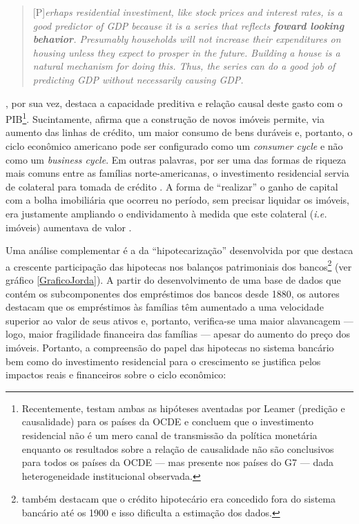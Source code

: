 \begin{quote}
	
	[P]\textit{erhaps residential investiment, like stock prices and interest rates, is a good predictor of GDP because it is a series that reflects \textbf{foward looking behavior}. Presumably households will not increase their expenditures on housing unless they expect to prosper in the future. Building a house is a natural mechanism for doing this. Thus, the series can do a good job of predicting GDP without necessarily causing GDP.}
	\cite[p.~267, grifos adicionados]{green_follow_1997}
\end{quote}
\textcite{leamer_housing_2007}, por sua vez, destaca a capacidade preditiva e relação causal  deste gasto com o PIB\footnote{Recentemente, \textcite{huang_is_2018} testam ambas as hipóteses aventadas por Leamer  (predição e causalidade) para os países da OCDE e concluem que o investimento residencial não é um mero canal de transmissão da política monetária enquanto os resultados sobre a relação de causalidade não são conclusivos para todos os países da OCDE --- mas presente nos países do G7 --- dada heterogeneidade institucional observada.}. Sucintamente, afirma que a construção de novos imóveis permite, via aumento das linhas de crédito, um maior consumo de bens duráveis e, portanto, o ciclo econômico americano pode ser configurado como um \textit{consumer cycle} e não como um \textit{business cycle}. Em outras palavras, por ser  uma das formas de riqueza mais comuns entre as famílias norte-americanas, o investimento residencial servia de colateral para tomada de crédito \cite{teixeira_uma_2011}. A forma de ``realizar'' o ganho de capital com a bolha imobiliária que ocorreu no período, sem precisar liquidar os imóveis, era justamente ampliando o endividamento à medida que este colateral (\textit{i.e.} imóveis) aumentava de valor \cite{teixeira_crescimento_2015}. 

Uma análise complementar é a da  ``hipotecarização'' desenvolvida por \textcite{jorda_great_2014} que destaca a crescente participação das hipotecas nos balanços patrimoniais dos bancos\footnote{\textcite{jorda_great_2014} também destacam que o crédito hipotecário era concedido fora do sistema bancário até os 1900 e isso dificulta a estimação dos dados.} (ver gráfico \ref{GraficoJorda}). A partir do desenvolvimento de uma base de dados que contém os subcomponentes dos empréstimos dos bancos desde 1880, os autores destacam que os empréstimos às famílias têm aumentado a uma velocidade superior ao valor de seus ativos e, portanto, verifica-se uma maior alavancagem --- logo, maior fragilidade financeira das famílias --- apesar do aumento do preço dos imóveis. Portanto, a compreensão do papel das hipotecas no sistema bancário bem como do investimento residencial para o crescimento se justifica pelos impactos reais e financeiros sobre o ciclo econômico: 


